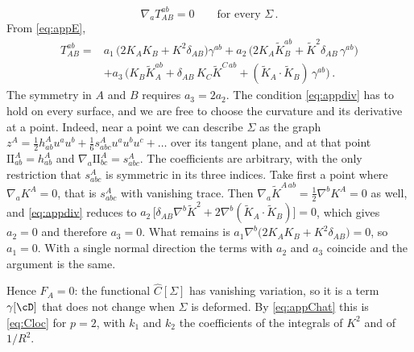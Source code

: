 \documentclass[a4paper,11pt]{article}
\newcommand{\II}{\mathrm{I\!I}}
\newcommand{\Kt}{\widetilde{K}}
\begin{document}
\begin{equation}\label{eq:appdiv}
	\nabla_aT_{AB}^{ab}=0\qquad\text{for every }\Sigma\, .
\end{equation}
From \eqref{eq:appE},
\begin{equation}
	\begin{aligned}
		T_{AB}^{ab}={}&a_1\,\bigl(2K_AK_B+K^2\delta_{AB}\bigr)\gamma^{ab}+a_2\,\bigl(2K_A\Kt_B^{ab}+\Kt^2\delta_{AB}\,\gamma^{ab}\bigr)\\
		&+a_3\,\bigl(K_B\Kt_A^{ab}+\delta_{AB}\,K_C\Kt^{C\,ab}+(\Kt_A\!\cdot\!\Kt_B)\,\gamma^{ab}\bigr)\, .
	\end{aligned}
\end{equation}
The symmetry in $A$ and $B$ requires $a_3=2a_2$. The condition \eqref{eq:appdiv} has to hold on every surface, and we are free to choose the curvature and its derivative at a point. Indeed, near a point we can describe $\Sigma$ as the graph $z^A=\tfrac12h^A_{ab}u^au^b+\tfrac16s^A_{abc}u^au^bu^c+\dots$ over its tangent plane, and at that point $\II^A_{ab}=h^A_{ab}$ and $\nabla_a\II^A_{bc}=s^A_{abc}$. The coefficients are arbitrary, with the only restriction that $s^A_{abc}$ is symmetric in its three indices. Take first a point where $\nabla_aK^A=0$, that is $s^A_{abc}$ with vanishing trace. Then $\nabla_a\Kt^{A\,ab}=\tfrac12\nabla^bK^A=0$ as well, and \eqref{eq:appdiv} reduces to $a_2\,\bigl[\delta_{AB}\nabla^b\Kt^2+2\nabla^b(\Kt_A\!\cdot\!\Kt_B)\bigr]=0$, which gives $a_2=0$ and therefore $a_3=0$. What remains is $a_1\nabla^b\bigl(2K_AK_B+K^2\delta_{AB}\bigr)=0$, so $a_1=0$. With a single normal direction the terms with $a_2$ and $a_3$ coincide and the argument is the same. 

Hence $F_A=0$: the functional $\widehat C[\Sigma]$ has vanishing variation, so it is a term $\gamma[\cD]$ that does not change when $\Sigma$ is deformed. By \eqref{eq:appChat} this is \eqref{eq:Cloc} for $p=2$, with $k_1$ and $k_2$ the coefficients of the integrals of $K^2$ and of $1/R^2$.




\end{document}
